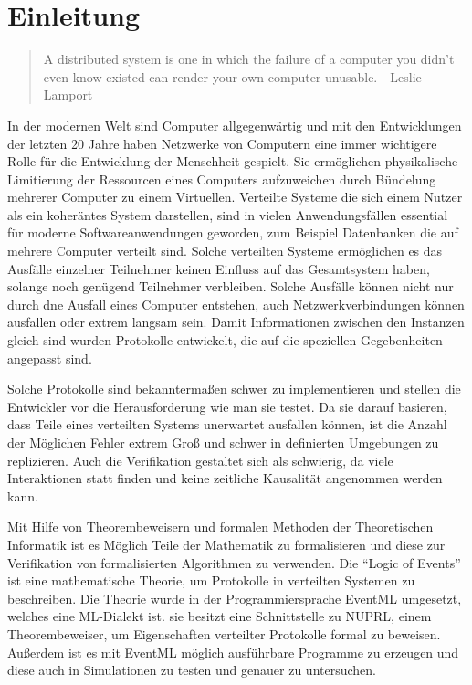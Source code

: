 
\section{Einleitung}
\label{sec_1}

\begin{quote}
A distributed system is one in which the failure of a computer you didn't even
know existed can render your own computer unusable. - Leslie Lamport
\end{quote}

In der modernen Welt sind Computer allgegenwärtig und mit den Entwicklungen
der letzten 20 Jahre haben Netzwerke von Computern eine immer wichtigere Rolle
für die Entwicklung der Menschheit gespielt. Sie ermöglichen physikalische
Limitierung der Ressourcen eines Computers aufzuweichen durch Bündelung
mehrerer Computer zu einem Virtuellen. Verteilte Systeme die sich einem Nutzer
als ein koheräntes System darstellen, sind in vielen Anwendungsfällen essential
für moderne Softwareanwendungen geworden, zum Beispiel Datenbanken die
auf mehrere Computer verteilt sind. Solche verteilten Systeme ermöglichen
es das Ausfälle einzelner Teilnehmer keinen Einfluss auf das Gesamtsystem haben,
solange noch genügend Teilnehmer verbleiben. Solche Ausfälle können nicht nur
durch dne Ausfall eines Computer entstehen, auch Netzwerkverbindungen können
ausfallen oder extrem langsam sein. Damit Informationen zwischen den
Instanzen gleich sind wurden Protokolle entwickelt, die auf die speziellen
Gegebenheiten angepasst sind.

Solche Protokolle sind bekanntermaßen schwer zu implementieren und stellen
die Entwickler vor die Herausforderung wie man sie testet. Da sie darauf
basieren, dass Teile eines verteilten Systems unerwartet ausfallen können,
ist die Anzahl der Möglichen Fehler extrem Groß und schwer in definierten
Umgebungen zu replizieren. Auch die Verifikation gestaltet sich als
schwierig, da viele Interaktionen statt finden und keine zeitliche
Kausalität angenommen werden kann.

Mit Hilfe von Theorembeweisern und formalen Methoden der Theoretischen
Informatik ist es Möglich Teile der Mathematik zu formalisieren und
diese zur Verifikation von formalisierten Algorithmen zu verwenden.
Die ``Logic of Events'' ist eine mathematische Theorie, um Protokolle
in verteilten Systemen zu beschreiben.
Die Theorie wurde in der Programmiersprache EventML umgesetzt, welches eine
ML-Dialekt ist. sie besitzt eine Schnittstelle zu NUPRL, einem Theorembeweiser,
um Eigenschaften verteilter Protokolle formal zu beweisen.
Außerdem ist es mit EventML möglich ausführbare Programme zu erzeugen und
diese auch in Simulationen zu testen und genauer zu untersuchen.

